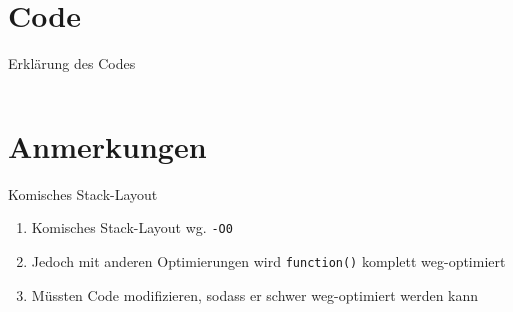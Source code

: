 \documentclass[aspectratio=169]{beamer}
\begin{document}
\section{Code}
\begin{frame}[fragile]{Erklärung des Codes}
\begin{columns}
\begin{column}{.5\textwidth}
  \vspace*{-12pt}
  \onslide<1->{%
    
  }
  \vspace*{-12pt}
  \vspace*{-12pt}
  \vspace*{-12pt}
  \vspace*{-12pt}
  \vspace*{-12pt}
  \vspace*{-12pt}
  \vspace*{-12pt}
\end{column}%
\hfill
\begin{column}{.5\textwidth}
  \onslide<1->{%
    
  }
\end{column}
\end{columns}
\vspace*{-30pt}
\end{frame}

\section{Anmerkungen}
\begin{frame}{Komisches Stack-Layout}

\begin{enumerate}
\item<1-> Komisches Stack-Layout wg. \texttt{-O0}
\item<2-> Jedoch mit anderen Optimierungen wird \texttt{function()} komplett weg-optimiert
\item<3-> Müssten Code modifizieren, sodass er schwer weg-optimiert werden kann
\end{enumerate}
\end{frame}
\end{document}
